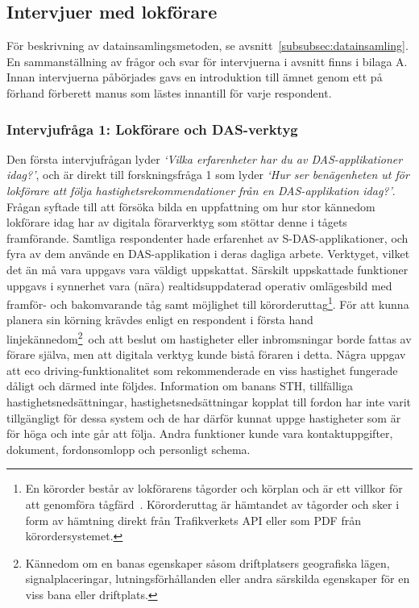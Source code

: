 \subsection{Intervjuer med lokförare}\label{subsec:intervjuer}
För beskrivning av datainsamlingsmetoden, se avsnitt~\ref{subsubsec:datainsamling}.
En sammanställning av frågor och svar för intervjuerna i avsnitt finns i bilaga A\@.
Innan intervjuerna påbörjades gavs en introduktion till ämnet genom ett på förhand förberett manus som lästes innantill för varje respondent.
\subsubsection{Intervjufråga 1: Lokförare och DAS-verktyg}
Den första intervjufrågan lyder \emph{\lq{}Vilka erfarenheter har du av DAS-applikationer idag?\rq{}}, och är direkt till forskningsfråga 1 som lyder \emph{\lq{}Hur ser benägenheten ut för lokförare att följa hastighetsrekommendationer från en DAS-applikation idag?\rq{}}.
Frågan syftade till att försöka bilda en uppfattning om hur stor kännedom lokförare idag har av digitala förarverktyg som stöttar denne i tågets framförande.
Samtliga respondenter hade erfarenhet av S-DAS-applikationer, och fyra av dem använde en DAS-applikation i deras dagliga arbete.
Verktyget, vilket det än må vara uppgavs vara väldigt uppskattat.
Särskilt uppskattade funktioner uppgavs i synnerhet vara (nära) realtidsuppdaterad operativ omlägesbild med framför- och bakomvarande tåg samt möjlighet till körorderuttag\footnote{En körorder består av lokförarens tågorder och körplan och är ett villkor för att genomföra tågfärd~\cite{TTJ2015}. Körorderuttag är hämtandet av tågorder och sker i form av hämtning direkt från Trafikverkets API eller som PDF från körordersystemet.}.
För att kunna planera sin körning krävdes enligt en respondent i första hand linjekännedom\footnote{Kännedom om en banas egenskaper såsom driftplatsers geografiska lägen, signalplaceringar, lutningsförhållanden eller andra särskilda egenskaper för en viss bana eller driftplats.}~och att beslut om hastigheter eller inbromsningar borde fattas av förare själva, men att digitala verktyg kunde bistå föraren i detta.
Några uppgav att eco driving-funktionalitet som rekommenderade en viss hastighet fungerade dåligt och därmed inte följdes.
Information om banans STH, tillfälliga hastighetsnedsättningar, hastighetsnedsättningar kopplat till fordon har inte varit tillgängligt för dessa system och de har därför kunnat uppge hastigheter som är för höga och inte går att följa.
Andra funktioner kunde vara kontaktuppgifter, dokument, fordonsomlopp och personligt schema.
